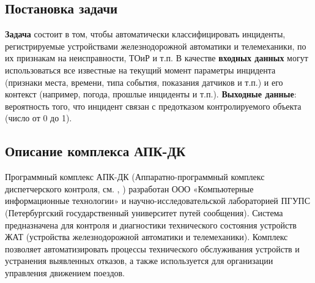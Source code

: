 \subsection{Постановка задачи}
\textbf{Задача} состоит в том, чтобы автоматически классифицировать инциденты, регистрируемые устройствами железнодорожной автоматики и телемеханики,  по их признакам на неисправности, ТОиР и т.п. В качестве \textbf{входных данных} могут использоваться все известные на текущий момент параметры инцидента (признаки места, времени, типа события, показания датчиков и т.п.) и его контекст (например, погода, прошлые инциденты и т.п.). \textbf{Выходные данные}: вероятность того, что инцидент связан с предотказом контролируемого объекта (число от 0 до 1).

\subsection{Описание комплекса АПК-ДК}
Программный комплекс АПК-ДК (Аппаратно-программный комплекс диспетчерского контроля, см. \cite{apk-dk-volkov}, \cite{apk-dk-piter}) разработан ООО «Компьютерные информационные технологии» и научно-исследовательской лабораторией ПГУПС (Петербургский государственный университет путей сообщения).  Система предназначена для контроля и диагностики технического состояния устройств ЖАТ (устройства железнодорожной автоматики и телемеханики).  Комплекс позволяет автоматизировать процессы технического обслуживания устройств и устранения выявленных отказов, а также используется для организации управления движением поездов.

